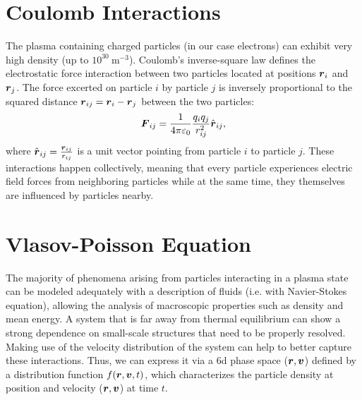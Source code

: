\section{Coulomb Interactions}
\label{section:coulombInteractions}

The plasma containing charged particles (in our case electrons) can exhibit very 
high density (up to $10^{30}\ \text{m}^{-3}$).
Coulomb's inverse-square law defines the electrostatic force interaction between two particles
located at positions $\boldsymbol{r}_i$ and $\boldsymbol{r}_j$.
The force excerted on particle $i$ by particle $j$ is inversely proportional to the squared distance
$\boldsymbol{r}_{ij} = \boldsymbol{r}_i - \boldsymbol{r}_j$ between the two particles:
\begin{equation}
    \boldsymbol{F}_{ij} = \frac{1}{4 \pi \varepsilon_0} \frac{q_i q_j}{r_{ij}^2} \hat{\boldsymbol{r}}_{ij},
    \label{eq:coulombForce}
\end{equation}
where $\hat{\boldsymbol{r}}_{ij} = \frac{\boldsymbol{r}_{ij}}{r_{ij}}$ is a unit vector pointing from particle $i$ to
particle $j$. 
These interactions happen collectively, meaning that every particle experiences electric field
forces from neighboring particles while at the same time, they themselves are influenced by particles nearby.

\section{Vlasov-Poisson Equation}
\label{section:vlasov_poisson}

The majority of phenomena arising from particles interacting in a plasma state can be modeled adequately with a
description of fluids (i.e. with Navier-Stokes equation), allowing the analysis of macroscopic
properties such as density and mean energy.
A system that is far away from thermal equilibrium can show a strong dependence on small-scale
structures that need to be properly resolved.
Making use of the velocity distribution of the system can help to better capture these interactions.
Thus, we can express it via a 6d phase space ($\boldsymbol{r}, \boldsymbol{v}$) defined by a
distribution function $f(\boldsymbol{r}, \boldsymbol{v}, t)$, which characterizes the particle density at position
and velocity ($\boldsymbol{r}, \boldsymbol{v}$) at time $t$.

